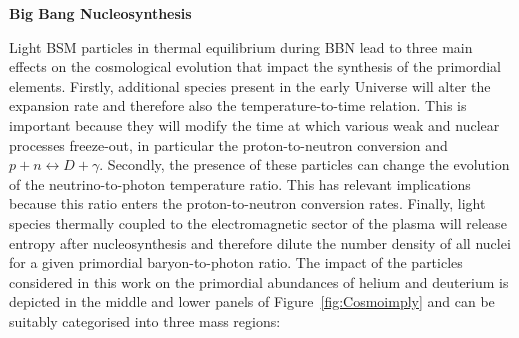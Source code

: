 \documentclass[notitlepage,letterpaper,natbib,aps,prd,onecolumn,amsmath,amsfonts,nofootinbib,preprintnumbers,superscriptaddress,secnumarabic,groupedaddress]{revtex4-1}
\begin{document}
\vspace{0.1cm}
\textbf{Big Bang Nucleosynthesis}

\noindent Light BSM particles in thermal equilibrium during BBN lead to three main effects on the cosmological evolution that impact the synthesis of the primordial elements. Firstly, additional species present in the early Universe will alter the expansion rate and therefore also the temperature-to-time relation. This is important because they will modify the time at which various weak and nuclear processes freeze-out, in particular the proton-to-neutron conversion and $p + n \leftrightarrow  D + \gamma$. Secondly, the presence of these particles can change the evolution of the neutrino-to-photon temperature ratio. This has relevant implications because this ratio enters the proton-to-neutron conversion rates. Finally, light species thermally coupled to the electromagnetic sector of the plasma will release entropy after nucleosynthesis and therefore dilute the number density of all nuclei for a given primordial baryon-to-photon ratio. The impact of the particles considered in this work on the primordial abundances of helium and deuterium is depicted in the middle and lower panels of Figure~\ref{fig:Cosmoimply} and can be suitably categorised into three mass regions:
\end{document}
